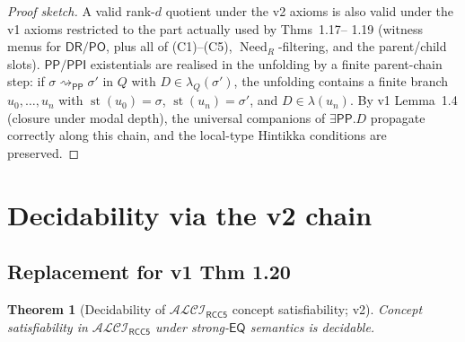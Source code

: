 \documentclass[11pt]{article}
\newtheorem{theorem}{Theorem}[section]
\theoremstyle{definition}
\theoremstyle{remark}
\newcommand{\DR}{\mathsf{DR}}
\newcommand{\PO}{\mathsf{PO}}
\newcommand{\PP}{\mathsf{PP}}
\newcommand{\PPI}{\mathsf{PPI}}
\newcommand{\EQ}{\mathsf{EQ}}
\newcommand{\Need}{\operatorname{Need}}
\newcommand{\st}{\operatorname{st}}
\newcommand{\reach}{\rightsquigarrow}
\newcommand{\ALCIRCC}[1]{\mathcal{ALCI}_{\mathsf{RCC#1}}}
\begin{document}
\begin{proof}[Proof sketch]
A valid rank-$d$ quotient under the v2 axioms is also valid under
the v1 axioms restricted to the part actually used by Thms~1.17--
1.19 (witness menus for $\DR/\PO$, plus all of (C1)--(C5),
$\Need_R$-filtering, and the parent/child slots).
$\PP/\PPI$ existentials are realised in the unfolding by a finite
parent-chain step: if $\sigma \reach_{\PP} \sigma'$ in $Q$ with $D
\in \lambda_Q(\sigma')$, the unfolding contains a finite branch
$u_0,\ldots,u_n$ with $\st(u_0) = \sigma$, $\st(u_n) = \sigma'$,
and $D \in \lambda(u_n)$. By v1 Lemma~1.4 (closure under modal
depth), the universal companions of $\exists\PP.D$ propagate
correctly along this chain, and the local-type Hintikka
conditions are preserved.
\end{proof}

\section{Decidability via the v2 chain}
\label{sec:decidability}

\subsection{Replacement for v1 Thm 1.20}

\begin{theorem}[Decidability of $\ALCIRCC{5}$ concept satisfiability;
  v2]\label{thm:decidability-v2}
Concept satisfiability in $\ALCIRCC{5}$ under strong-$\EQ$
semantics is decidable.
\end{theorem}
\end{document}
